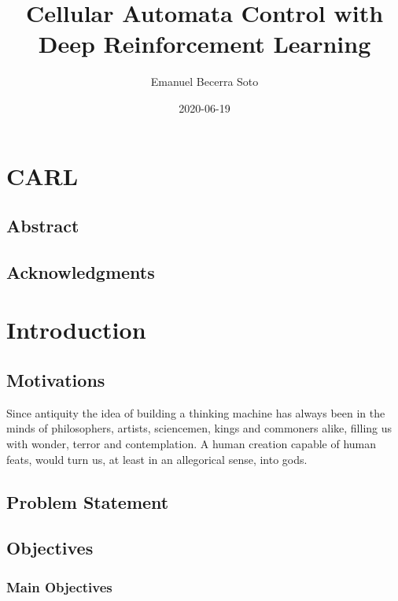 \documentclass[
]{book}
\title{Cellular Automata Control with Deep Reinforcement Learning}
\author{Emanuel Becerra Soto}
\date{2020-06-19}
\begin{document}
\maketitle

{
\setcounter{tocdepth}{1}
\tableofcontents
}
\hypertarget{carl}{%
\chapter{CARL}\label{carl}}

\hypertarget{abstract}{%
\section{Abstract}\label{abstract}}

\hypertarget{acknowledgments}{%
\section{Acknowledgments}\label{acknowledgments}}

\hypertarget{introduction}{%
\chapter{Introduction}\label{introduction}}

\hypertarget{motivations}{%
\section{Motivations}\label{motivations}}

Since antiquity the idea of building a thinking machine has always been in the minds of philosophers, artists, sciencemen, kings and commoners alike, filling us with wonder, terror and contemplation. A human creation capable of human feats, would turn us, at least in an allegorical sense, into gods.

\hypertarget{problem-statement}{%
\section{Problem Statement}\label{problem-statement}}

\hypertarget{objectives}{%
\section{Objectives}\label{objectives}}

\hypertarget{main-objectives}{%
\subsection{Main Objectives}\label{main-objectives}}
\end{document}
